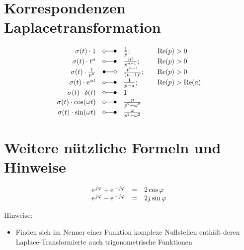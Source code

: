 \section{Korrespondenzen Laplacetransformation}
\begin{align*}
\begin{array}{rcll}
	\sigma(t) \cdot 1 & \laplace & \frac{1}{p}; & \quad \mbox{Re}(p) > 0\\
	\sigma(t) \cdot t^n & \laplace & \frac{n!}{p^{n+1}}; & \quad \mbox{Re}(p) > 0\\
	\sigma(t) \cdot \frac{1}{p^n} & \Laplace & \frac{t^{n-1}}{(n-1)!}; & \quad \mbox{Re}(p) > 0\\
	\sigma(t) \cdot \e^{at} & \laplace & \frac{1}{p-a}; & \quad \mbox{Re}(p) > \mbox{Re}(a)\\
	\sigma(t) \cdot \delta(t) & \laplace & 1 & {}\\
	\sigma(t) \cdot \cos(\omega t) & \laplace & \frac{p}{p^2 + \omega^2} & {}\\
	\sigma(t) \cdot \sin(\omega t) & \laplace & \frac{\omega}{p^2 + \omega^2} & {}
\end{array}
\end{align*}

\section{Weitere nützliche Formeln und Hinweise}
\begin{align*}
\begin{array}{lcl}
\e^{j \varphi} + \e^{-j \varphi} & = & 2 \cos \varphi\\ 
\e^{j \varphi} - \e^{-j \varphi} & = & 2 j \sin \varphi\\ 
\end{array}
\end{align*}

Hinweise:\\
\begin{itemize}
	\item Finden sich im Nenner einer Funktion komplexe Nullstellen enthält deren Laplace-Transformierte auch trigonometrische Funktionen
\end{itemize}
